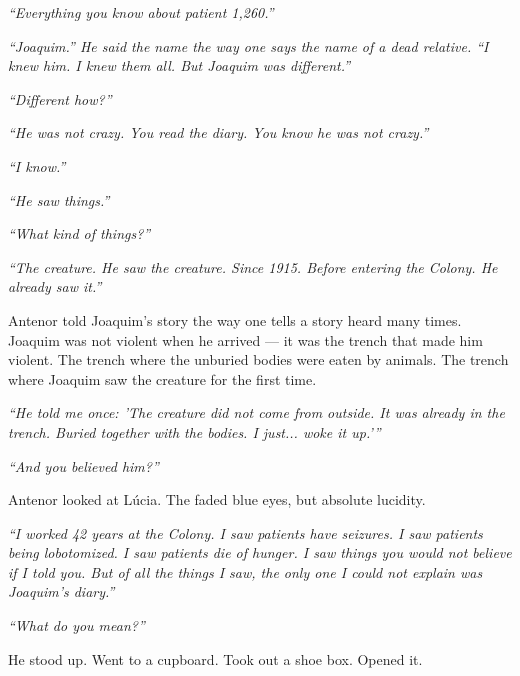 \noindent \textit{\textquotedblleft{}Everything you know about patient 1,260.\textquotedblright{}}

\noindent \textit{\textquotedblleft{}Joaquim.\textquotedblright{}\textit{ He said the name the way one says the name of a dead relative. }\textquotedblleft{}I knew him. I knew them all. But Joaquim was different.\textquotedblright{}}

\noindent \textit{\textquotedblleft{}Different how?\textquotedblright{}}

\noindent \textit{\textquotedblleft{}He was not crazy. You read the diary. You know he was not crazy.\textquotedblright{}}

\noindent \textit{\textquotedblleft{}I know.\textquotedblright{}}

\noindent \textit{\textquotedblleft{}He saw things.\textquotedblright{}}

\noindent \textit{\textquotedblleft{}What kind of things?\textquotedblright{}}

\noindent \textit{\textquotedblleft{}The creature. He saw the creature. Since 1915. Before entering the Colony. He already saw it.\textquotedblright{}}

\noindent Antenor told Joaquim's story the way one tells a story heard many times. Joaquim was not violent when he arrived --- it was the trench that made him violent. The trench where the unburied bodies were eaten by animals. The trench where Joaquim saw the creature for the first time.

\noindent \textit{\textquotedblleft{}He told me once: 'The creature did not come from outside. It was already in the trench. Buried together with the bodies. I just... woke it up.'\textquotedblright{}}

\noindent \textit{\textquotedblleft{}And you believed him?\textquotedblright{}}

\noindent Antenor looked at Lúcia. The faded blue eyes, but absolute lucidity.

\noindent \textit{\textquotedblleft{}I worked 42 years at the Colony. I saw patients have seizures. I saw patients being lobotomized. I saw patients die of hunger. I saw things you would not believe if I told you. But of all the things I saw, the only one I could not explain was Joaquim's diary.\textquotedblright{}}

\noindent \textit{\textquotedblleft{}What do you mean?\textquotedblright{}}

\noindent He stood up. Went to a cupboard. Took out a shoe box. Opened it.

